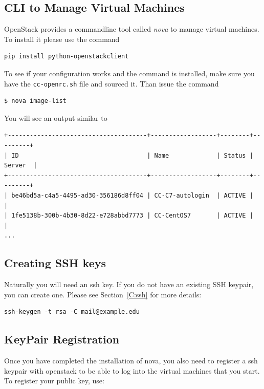 \subsection{CLI to Manage Virtual Machines}

OpenStack provides a commandline tool called \textit{nova} to manage
virtual machines. To install it please use the command

\begin{lstlisting}
pip install python-openstackclient
\end{lstlisting}

To see if your configuration works and the command is installed, make
sure you have the \verb|cc-openrc.sh| file and sourced it. Than issue
the command

\begin{lstlisting}
$ nova image-list
\end{lstlisting}

You will see an output similar to 

\begin{lstlisting}
+--------------------------------------+------------------+--------+---------+
| ID                                   | Name             | Status | Server  |
+--------------------------------------+------------------+--------+---------+
| be46bd5a-c4a5-4495-ad30-356186d8ff04 | CC-C7-autologin  | ACTIVE |         |
| 1fe5138b-300b-4b30-8d22-e728abbd7773 | CC-CentOS7       | ACTIVE |         |
...
\end{lstlisting}

\subsection{Creating SSH keys}

Naturally you will need an ssh key.  If you do not have an existing
SSH keypair, you can create one. Please see Section~\ref{C:ssh} for
more details:

\begin{lstlisting}
ssh-keygen -t rsa -C mail@example.edu
\end{lstlisting}

\subsection{KeyPair Registration}

Once you have completed the installation of nova, you also need to
register a ssh keypair with openstack to be able to log into the
virtual machines that you start. To register your public key, use:

